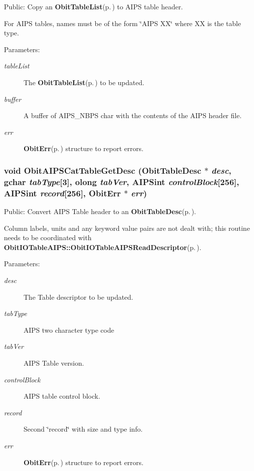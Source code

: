 Public: Copy an {\bf Obit\-Table\-List}{\rm (p.\,\pageref{structObitTableList})} to AIPS table header. 

For AIPS tables, names must be of the form \char`\"{}AIPS XX\char`\"{} where XX is the table type. \begin{Desc}
\item[Parameters:]
\begin{description}
\item[{\em table\-List}]The {\bf Obit\-Table\-List}{\rm (p.\,\pageref{structObitTableList})} to be updated. \item[{\em buffer}]A buffer of AIPS\_\-NBPS char with the contents of the AIPS header file. \item[{\em err}]{\bf Obit\-Err}{\rm (p.\,\pageref{structObitErr})} structure to report errors. \end{description}
\end{Desc}
\subsubsection{\setlength{\rightskip}{0pt plus 5cm}void Obit\-AIPSCat\-Table\-Get\-Desc ({\bf Obit\-Table\-Desc} $\ast$ {\em desc}, gchar {\em tab\-Type}[3], {\bf olong} {\em tab\-Ver}, {\bf AIPSint} {\em control\-Block}[256], {\bf AIPSint} {\em record}[256], {\bf Obit\-Err} $\ast$ {\em err})}\label{ObitAIPSCat_8h_a6}


Public: Convert AIPS Table header to an {\bf Obit\-Table\-Desc}{\rm (p.\,\pageref{structObitTableDesc})}. 

Column labels, units and any keyword value pairs are not dealt with; this routine needs to be coordinated with {\bf Obit\-IOTable\-AIPS::Obit\-IOTable\-AIPSRead\-Descriptor}{\rm (p.\,\pageref{ObitIOTableAIPS_8c_a23})}. \begin{Desc}
\item[Parameters:]
\begin{description}
\item[{\em desc}]The Table descriptor to be updated. \item[{\em tab\-Type}]AIPS two character type code \item[{\em tab\-Ver}]AIPS Table version. \item[{\em control\-Block}]AIPS table control block. \item[{\em record}]Second \char`\"{}record\char`\"{} with size and type info. \item[{\em err}]{\bf Obit\-Err}{\rm (p.\,\pageref{structObitErr})} structure to report errors. \end{description}
\end{Desc}
